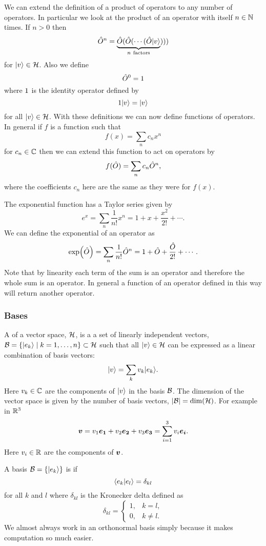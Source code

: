     We can extend the definition of a product of operators to any number of operators.
    In particular we look at the product of an operator with itself \(n\in\mathbb{N}\) times.
    If \(n > 0\) then
    \[\hat{O}^n = \underbrace{\hat{O}(\hat{O}(\dotsb(\hat{O}\vert {v} \rangle}_{n~\text{factors}})))\]
    for \(\vert {v} \rangle\in\mathcal{H}\).
    Also we define
    \[\hat{O}^0 = 1\]
    where \(1\) is the identity operator defined by
    \[1\vert {v} \rangle = \vert {v} \rangle\]
    for all \(\vert {v} \rangle\in\mathcal{H}\).
    With these definitions we can now define functions of operators.
    In general if \(f\) is a function such that
    \[f(x) = \sum_n c_nx^n\]
    for \(c_n\in\mathbb{C}\) then we can extend this function to act on operators by
    \[f(\hat{O}) = \sum_n c_n\hat{O}^n,\]
    where the coefficients \(c_n\) here are the same as they were for \(f(x)\).
    \begin{example}
        The exponential function has a Taylor series given by
        \[e^x = \sum_n \frac{1}{n!}x^n = 1 + x + \frac{x^2}{2!} + \dotsb.\]
        We can define the exponential of an operator as
        \[\exp(\hat{O}) = \sum_n \frac{1}{n!}\hat{O}^n = 1 + \hat{O} + \frac{\hat{O}}{2!} + \dotsb.\]
        Note that by linearity each term of the sum is an operator and therefore the whole sum is an operator.
        In general a function of an operator defined in this way will return another operator.
    \end{example}
    \subsubsection{Bases}
    A  of a vector space, \(\mathcal{H}\), is a a set of linearly independent vectors, \(\mathcal{B} = \{\vert {e_k} \rangle\mid k = 1, \dotsc, n\}\subset\mathcal{H}\) such that all \(\vert {v} \rangle\in\mathcal{H}\) can be expressed as a linear combination of basis vectors:
    \[\vert {v} \rangle = \sum_k v_k\vert {e_k} \rangle.\]
    Here \(v_k\in\mathbb{C}\) are the components of \(\vert {v} \rangle\) in the basis \(\mathcal{B}\).
    The dimension of the vector space is given by the number of basis vectors, \(\abs{\mathcal{B}} = \dim(\mathcal{H})\).
    For example in \(\mathbb{R}^3\)
    \[\bm{v} = v_1\bm{e_{1}} + v_2\bm{e_{2}} + v_3\bm{e_{3}} = \sum_{i=1}^3 v_i\bm{e_{i}}.\]
    Here \(v_i\in\mathbb{R}\) are the components of \(\bm{v}\).
    
    A basis \(\mathcal{B} = \{\vert {e_k} \rangle\}\) is  if
    \[\langle {e_k} \vert {e_l} \rangle = \delta_{kl}\]
    for all \(k\) and \(l\) where \(\delta_{kl}\) is the Kronecker delta defined as
    \[
        \delta_{kl} = 
        \begin{cases}
            1, & k = l,\\
            0, & k \ne l.
        \end{cases}
    \]
    We almost always work in an orthonormal basis simply because it makes computation so much easier.
    
